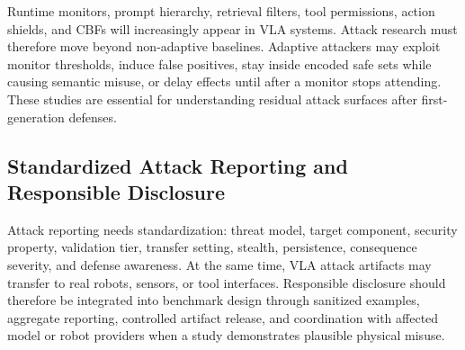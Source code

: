 Runtime monitors, prompt hierarchy, retrieval filters, tool permissions, action shields, and CBFs will increasingly appear in VLA systems. Attack research must therefore move beyond non-adaptive baselines. Adaptive attackers may exploit monitor thresholds, induce false positives, stay inside encoded safe sets while causing semantic misuse, or delay effects until after a monitor stops attending. These studies are essential for understanding residual attack surfaces after first-generation defenses.

\subsection{Standardized Attack Reporting and Responsible Disclosure}

Attack reporting needs standardization: threat model, target component, security property, validation tier, transfer setting, stealth, persistence, consequence severity, and defense awareness. At the same time, VLA attack artifacts may transfer to real robots, sensors, or tool interfaces. Responsible disclosure should therefore be integrated into benchmark design through sanitized examples, aggregate reporting, controlled artifact release, and coordination with affected model or robot providers when a study demonstrates plausible physical misuse.
